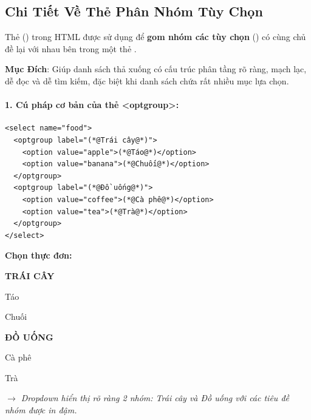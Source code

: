 \subsection{Chi Tiết Về Thẻ Phân Nhóm Tùy Chọn }

\begin{conceptBox}
Thẻ  () trong HTML được sử dụng để \textbf{gom nhóm các tùy chọn} () có cùng chủ đề lại với nhau bên trong một thẻ .
\par\vspace{4pt}
\textbf{ Mục Đích}: Giúp danh sách thả xuống có cấu trúc phân tầng rõ ràng, mạch lạc, dễ đọc và dễ tìm kiếm, đặc biệt khi danh sách chứa rất nhiều mục lựa chọn.
\end{conceptBox}

\paragraph{1. Cú pháp cơ bản của thẻ <optgroup>:}

\begin{codeWindow}
\begin{lstlisting}[language=HTML5]
<select name="food">
  <optgroup label="(*@Trái cây@*)">
    <option value="apple">(*@Táo@*)</option>
    <option value="banana">(*@Chuối@*)</option>
  </optgroup>
  <optgroup label="(*@Đồ uống@*)">
    <option value="coffee">(*@Cà phê@*)</option>
    <option value="tea">(*@Trà@*)</option>
  </optgroup>
</select>
\end{lstlisting}
\end{codeWindow}

\begin{browserWindow}
\sffamily\small
\textbf{Chọn thực đơn:} \par\vspace{4pt}
\begin{tcolorbox}[arc=2pt, colback=white, colframe=primaryBlue!50, boxsep=4pt, width=0.6\linewidth]
  \small
  \textbf{\textcolor{gray!80}{TRÁI CÂY}} \par\vspace{2pt}
  \quad Táo \par\vspace{2pt}
  \quad Chuối \par\vspace{3pt}
  \textbf{\textcolor{gray!80}{ĐỒ UỐNG}} \par\vspace{2pt}
  \quad Cà phê \par\vspace{2pt}
  \quad Trà
\end{tcolorbox}
\par\vspace{4pt}
\textcolor{codeComment}{\small\textit{$\rightarrow$ Dropdown hiển thị rõ ràng 2 nhóm: Trái cây và Đồ uống với các tiêu đề nhóm được in đậm.}}
\end{browserWindow}

